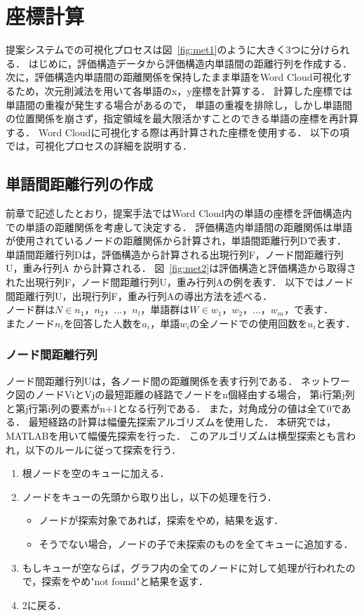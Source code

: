 \documentclass[syuuron]{kuee}
\begin{document}
	\section{座標計算}
		提案システムでの可視化プロセスは図~\ref{fig:met1}のように大きく3つに分けられる．
		はじめに，評価構造データから評価構造内単語間の距離行列を作成する．
		次に，評価構造内単語間の距離関係を保持したまま単語をWord Cloud可視化するため，次元削減法を用いて各単語のx，y座標を計算する．
		計算した座標では単語間の重複が発生する場合があるので，
		単語の重複を排除し，しかし単語間の位置関係を崩さず，指定領域を最大限活かすことのできる単語の座標を再計算する．
		Word Cloudに可視化する際は再計算された座標を使用する．
		以下の項では，可視化プロセスの詳細を説明する．
		
		\subsection{単語間距離行列の作成}
			前章で記述したとおり，提案手法ではWord Cloud内の単語の座標を評価構造内での単語の距離関係を考慮して決定する．
			評価構造内単語間の距離関係は単語が使用されているノードの距離関係から計算され，単語間距離行列Dで表す．
			単語間距離行列Dは，評価構造から計算される出現行列F，ノード間距離行列U，重み行列A から計算される．
			図~\ref{fig:met2}は評価構造と評価構造から取得された出現行列F，ノード間距離行列U，重み行列Aの例を表す．
			以下ではノード間距離行列U，出現行列F，重み行列Aの導出方法を述べる．
			$ノード群はN \in {n_{1}，n_{2}，...，n_{l}}，単語群はW \in {w_{1}，w_{2}，...，w_{m}}，で表す．$
			$またノードn_iを回答した人数をa_i，単語w_iの全ノードでの使用回数をu_iと表す．$
			
			\subsubsection{ノード間距離行列}
				ノード間距離行列Uは，各ノード間の距離関係を表す行列である．
				ネットワーク図のノードViとVjの最短距離の経路でノードをn個経由する場合，
				第i行第j列と第j行第i列の要素がn+1となる行列である．
				また，対角成分の値は全て0である．
				最短経路の計算は幅優先探索アルゴリズムを使用した．
				本研究では，MATLABを用いて幅優先探索を行った．
				このアルゴリズムは横型探索とも言われ，以下のルールに従って探索を行う．
				
				\begin{enumerate}
					\item 根ノードを空のキューに加える．
					\item ノードをキューの先頭から取り出し，以下の処理を行う．
						\begin{itemize}
							\item ノードが探索対象であれば，探索をやめ，結果を返す．
							\item そうでない場合，ノードの子で未探索のものを全てキューに追加する．
						\end{itemize}
					\item もしキューが空ならば，グラフ内の全てのノードに対して処理が行われたので，探索をやめ"not found"と結果を返す．
					\item 2に戻る．
				\end{enumerate}
				
\end{document}
